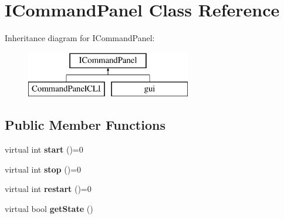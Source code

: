 \hypertarget{class_i_command_panel}{
\section{ICommandPanel Class Reference}
\label{class_i_command_panel}
}
Inheritance diagram for ICommandPanel:\begin{figure}[H]
\begin{center}
\leavevmode
\includegraphics[height=2.000000cm]{class_i_command_panel}
\end{center}
\end{figure}
\subsection*{Public Member Functions}
\begin{DoxyCompactItemize}
\item 
\hypertarget{class_i_command_panel_a740f6e219fadf8eb42bca24fb5d2facc}{
virtual int {\bfseries start} ()=0}
\label{class_i_command_panel_a740f6e219fadf8eb42bca24fb5d2facc}

\item 
\hypertarget{class_i_command_panel_a3655a8d2d748f369a6a3691428992ddb}{
virtual int {\bfseries stop} ()=0}
\label{class_i_command_panel_a3655a8d2d748f369a6a3691428992ddb}

\item 
\hypertarget{class_i_command_panel_ab186158f2cdf60fe116df3d4f6eec399}{
virtual int {\bfseries restart} ()=0}
\label{class_i_command_panel_ab186158f2cdf60fe116df3d4f6eec399}

\item 
\hypertarget{class_i_command_panel_a4db30265210e012ccadc80311270c7bb}{
virtual bool {\bfseries getState} ()}
\label{class_i_command_panel_a4db30265210e012ccadc80311270c7bb}

\end{DoxyCompactItemize}
